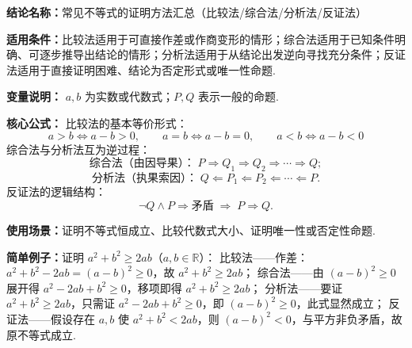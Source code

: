 \textbf{结论名称：}常见不等式的证明方法汇总（比较法/综合法/分析法/反证法）

\textbf{适用条件：}比较法适用于可直接作差或作商变形的情形；综合法适用于已知条件明确、可逐步推导出结论的情形；分析法适用于从结论出发逆向寻找充分条件；反证法适用于直接证明困难、结论为否定形式或唯一性命题.

\textbf{变量说明：} $a,b$ 为实数或代数式；$P, Q$ 表示一般的命题.

\textbf{核心公式：}
比较法的基本等价形式：
\[
\boxed{a>b \iff a-b>0,\qquad a=b \iff a-b=0,\qquad a<b \iff a-b<0}
\]
综合法与分析法互为逆过程：
\[
\text{综合法（由因导果）：}\; P \Rightarrow Q_1 \Rightarrow Q_2 \Rightarrow \cdots \Rightarrow Q;
\]
\[
\text{分析法（执果索因）：}\; Q \Leftarrow P_1 \Leftarrow P_2 \Leftarrow \cdots \Leftarrow P.
\]
反证法的逻辑结构：
\[
\neg Q \land P \Rightarrow \text{矛盾} \;\Longrightarrow\; P \Rightarrow Q.
\]

\textbf{使用场景：}证明不等式恒成立、比较代数式大小、证明唯一性或否定性命题.

\textbf{简单例子：}证明 $a^2+b^2 \ge 2ab$（$a,b\in\mathbb{R}$）：
比较法——作差：$a^2+b^2-2ab = (a-b)^2 \ge 0$，故 $a^2+b^2 \ge 2ab$；
综合法——由 $(a-b)^2 \ge 0$ 展开得 $a^2-2ab+b^2 \ge 0$，移项即得 $a^2+b^2 \ge 2ab$；
分析法——要证 $a^2+b^2 \ge 2ab$，只需证 $a^2-2ab+b^2 \ge 0$，即 $(a-b)^2 \ge 0$，此式显然成立；
反证法——假设存在 $a,b$ 使 $a^2+b^2 < 2ab$，则 $(a-b)^2 < 0$，与平方非负矛盾，故原不等式成立.